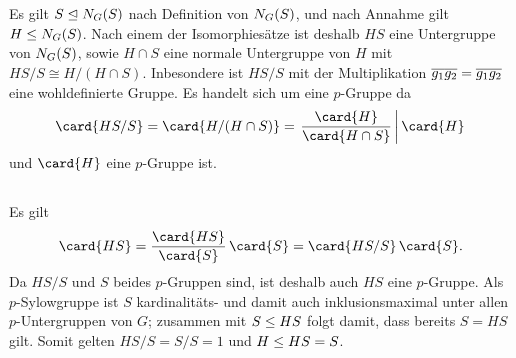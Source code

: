 \section{}





\addtocounter{subsection}{1}





\addtocounter{subsection}{1}





\subsection{}

Es gilt $S \nsubgroup \normalizer{S}{G}$ nach Definition von $\normalizer{S}{G}$, und nach Annahme gilt $H \subgroup \normalizer{S}{G}$.
Nach einem der Isomorphiesätze ist deshalb $HS$ eine Untergruppe von $\normalizer{S}{G}$, sowie $H \cap S$ eine normale Untergruppe von $H$ mit $HS/S \cong H/(H \cap S)$.
Inbesondere ist $HS/S$ mit der Multiplikation $\class{g_1} \class{g_2} = \class{g_1 g_2}$ eine wohldefinierte Gruppe.
Es handelt sich um eine $p$-Gruppe da
\[
                \card{ HS/S }
  =             \card{ H/(H \cap S) }
  = \left.      \frac{ \card{H} }{ \card{H \cap S} }
  \,\middle|\,  \card{H}
    \right.
\]
und $\card{H}$ eine $p$-Gruppe ist.





\subsection{}
\label{subsection: contained in Sylow subgroup}

Es gilt
\[
    \card{HS}
  = \frac{\card{HS}}{\card{S}} \, \card{S}
  = \card{HS/S} \, \card{S}.
\]
Da $HS/S$ und $S$ beides $p$-Gruppen sind, ist deshalb auch $HS$ eine $p$-Gruppe.
Als $p$-Sylowgruppe ist $S$ kardinalitäts- und damit auch inklusionsmaximal unter allen $p$-Untergruppen von $G$;
zusammen mit $S \subgroup HS$ folgt damit, dass bereits $S = HS$ gilt.
Somit gelten $HS/S = S/S = 1$ und $H \subgroup HS = S$.





\subsection{}

